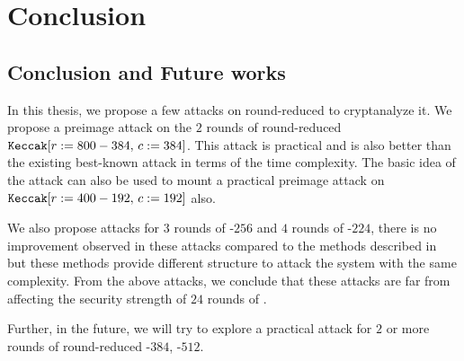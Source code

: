 \chapter{Conclusion}

\section{Conclusion and Future works}
In this thesis, we propose a few attacks on round-reduced \KECCAK{} to cryptanalyze it. We propose a preimage attack on the $2$ rounds of round-reduced $\mbox{\texttt{Keccak}}[r:=800-384,\,c:=384]$. This attack is practical and is also better than the existing best-known attack in terms of the time complexity. The basic idea of the attack can also be used to mount a practical preimage attack on $\mbox{\texttt{Keccak}}[r:=400-192,\, c:=192]$ also.
 
We also propose attacks for $3$ rounds of \Keccak{}-$256$ and $4$ rounds of \Keccak-$224$, there is no improvement observed in these attacks compared to the methods described in~\cite{guo2016linear} but these methods provide different structure to attack the system with the same complexity.
From the above attacks, we conclude that these attacks are far from affecting the security strength of $24$ rounds of \Keccak{}.

Further, in the future, we will try to explore a practical attack for $2$ or more rounds of round-reduced \KECCAK-$384$, \KECCAK-$512$.
